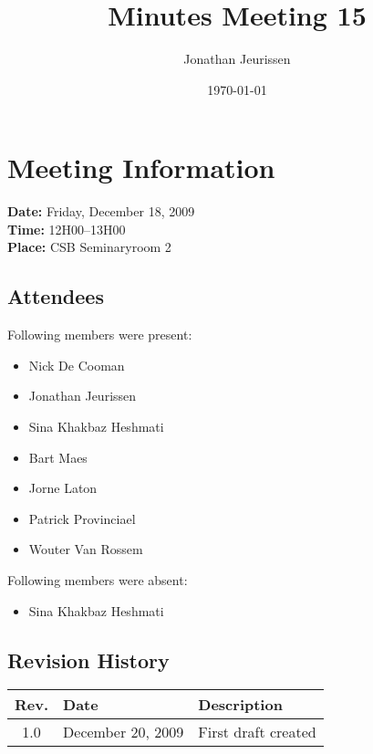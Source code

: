 \documentclass[a4paper, 12pt]{article}
\begin{document}
\title{Minutes Meeting 15}
\author{Jonathan Jeurissen}
\date{\today}

\maketitle	
	\section{Meeting Information}
		\textbf{Date:} Friday, December 18, 2009\\
		\textbf{Time:} 12H00--13H00\\
		\textbf{Place:} CSB Seminaryroom 2\\
		\subsection{Attendees}
Following members were present:
			\begin{itemize}
				\item Nick De Cooman
				\item Jonathan Jeurissen
				\item Sina Khakbaz Heshmati
				\item Bart Maes
				\item Jorne Laton
				\item Patrick Provinciael
				\item Wouter Van Rossem
			\end{itemize}
Following members were absent:
			\begin{itemize}
			 \item Sina Khakbaz Heshmati
			\end{itemize}
			
		\subsection{Revision History}
			\begin{tabular}{c | l | l }
				\textbf{Rev.} & \textbf{Date} & \textbf{Description} \\
				\hline
				1.0 & December 20, 2009 & First draft created \\
			\end{tabular}		
\end{document}
